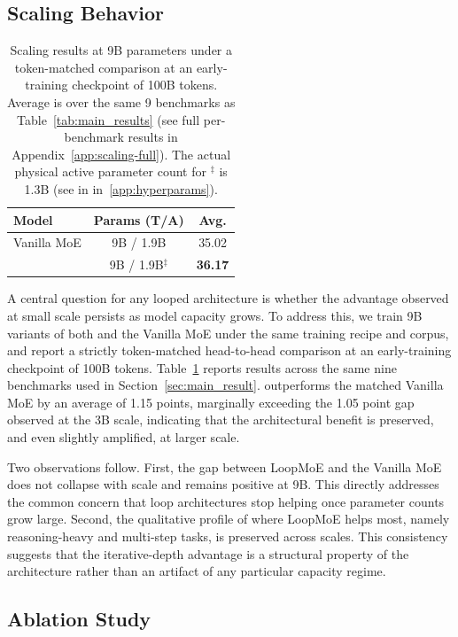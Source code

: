 \subsection{Scaling Behavior}
\label{sec:scaling}
\begin{table}[t]
\centering
\small
\begin{tabular}{lcc}
\toprule
\textbf{Model} & \textbf{Params (T/A)} & \textbf{Avg.} \\
\midrule
Vanilla MoE & 9B / 1.9B            & 35.02 \\
\textbf{\ourmodelnospace}     & 9B / 1.9B$^\ddagger$ & \textbf{36.17} \\
\bottomrule
\end{tabular}
\caption{Scaling results at 9B parameters under a token-matched comparison at an early-training checkpoint of 100B tokens. Average is over the same 9 benchmarks as Table~\ref{tab:main_results} (see full per-benchmark results in Appendix~\ref{app:scaling-full}). The actual physical active parameter count for $^\ddagger$ is 1.3B (see in in~\ref{app:hyperparams}).}
\label{tab:scaling}
\end{table}

A central question for any looped architecture is whether the advantage observed at small scale persists as model capacity grows. To address this, we train 9B variants of both \ourmodel and the Vanilla MoE under the same training recipe and corpus, and report a strictly token-matched head-to-head comparison at an early-training checkpoint of 100B tokens. Table~\ref{tab:scaling} reports results across the same nine benchmarks used in Section~\ref{sec:main_result}. \ourmodel outperforms the matched Vanilla MoE by an average of 1.15 points, marginally exceeding the 1.05 point gap observed at the 3B scale, indicating that the architectural benefit is preserved, and even slightly amplified, at larger scale.

Two observations follow. First, the gap between LoopMoE and the Vanilla MoE does not collapse with scale and remains positive at 9B. This directly addresses the common concern that loop architectures stop helping once parameter counts grow large. Second, the qualitative profile of where LoopMoE helps most, namely reasoning-heavy and multi-step tasks, is preserved across scales. This consistency suggests that the iterative-depth advantage is a structural property of the architecture rather than an artifact of any particular capacity regime.




\subsection{Ablation Study}
\label{sec:ablation}

